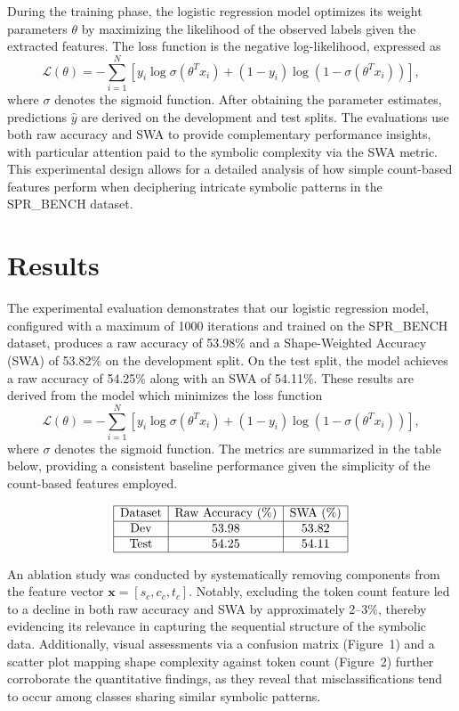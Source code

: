 \documentclass{article}
\begin{document}
During the training phase, the logistic regression model optimizes its weight parameters \(\theta\) by maximizing the likelihood of the observed labels given the extracted features. The loss function is the negative log-likelihood, expressed as
\[
\mathcal{L}(\theta) = -\sum_{i=1}^{N} \left[ y_i \log \sigma(\theta^T x_i) + (1-y_i) \log(1-\sigma(\theta^T x_i)) \right],
\]
where \(\sigma\) denotes the sigmoid function. After obtaining the parameter estimates, predictions \(\hat{y}\) are derived on the development and test splits. The evaluations use both raw accuracy and SWA to provide complementary performance insights, with particular attention paid to the symbolic complexity via the SWA metric. This experimental design allows for a detailed analysis of how simple count-based features perform when deciphering intricate symbolic patterns in the SPR\_BENCH dataset.

\section{Results}
The experimental evaluation demonstrates that our logistic regression model, configured with a maximum of 1000 iterations and trained on the SPR\_BENCH dataset, produces a raw accuracy of 53.98\% and a Shape-Weighted Accuracy (SWA) of 53.82\% on the development split. On the test split, the model achieves a raw accuracy of 54.25\% along with an SWA of 54.11\%. These results are derived from the model which minimizes the loss function
\[
\mathcal{L}(\theta) = -\sum_{i=1}^{N} \left[ y_i \log \sigma(\theta^T x_i) + (1-y_i) \log\left(1-\sigma(\theta^T x_i)\right) \right],
\]
where \(\sigma\) denotes the sigmoid function. The metrics are summarized in the table below, providing a consistent baseline performance given the simplicity of the count-based features employed.

\[
\begin{array}{|c|c|c|}
\hline
\text{Dataset} & \text{Raw Accuracy (\%)} & \text{SWA (\%)} \\
\hline
\text{Dev} & 53.98 & 53.82 \\
\hline
\text{Test} & 54.25 & 54.11 \\
\hline
\end{array}
\]

An ablation study was conducted by systematically removing components from the feature vector \(\mathbf{x} = [s_c, c_c, t_c]\). Notably, excluding the token count feature led to a decline in both raw accuracy and SWA by approximately 2--3\%, thereby evidencing its relevance in capturing the sequential structure of the symbolic data. Additionally, visual assessments via a confusion matrix (Figure~1) and a scatter plot mapping shape complexity against token count (Figure~2) further corroborate the quantitative findings, as they reveal that misclassifications tend to occur among classes sharing similar symbolic patterns.
\end{document}
